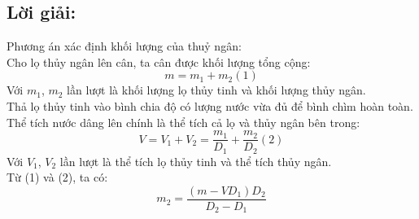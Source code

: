 \documentclass[50pt]{article}
\begin{document}
\subsection*{\color[HTML]{4287f5}Lời giải:}
Phương án xác định khối lượng của thuỷ ngân:\\
Cho lọ thủy ngân lên cân, ta cân được khối lượng tổng cộng:
\begin{equation*}
    m = m_{1} + m_{2} (1)
\end{equation*}
Với $m_{1}$, $m_{2}$ lần lượt là khối lượng lọ thủy tinh và khối lượng thủy ngân.\\
Thả lọ thủy tinh vào bình chia độ có lượng nước vừa đủ để bình chìm hoàn toàn. Thể tích nước dâng lên chính là thể tích cả lọ và thủy ngân bên trong:
\begin{equation*}
    V = V_{1} + V_{2} = \dfrac{m_{1}}{D_{1}} + \dfrac{m_{2}}{D_{2}} (2)
\end{equation*}
Với $V_{1}$, $V_{2}$ lần lượt là thể tích lọ thủy tinh và thể tích thủy ngân.\\
Từ (1) và (2), ta có:\\
\begin{equation*}
    m_{2} = \dfrac{(m - VD_{1})D_{2}}{D_{2} - D_{1}}
\end{equation*}
\end{document}
